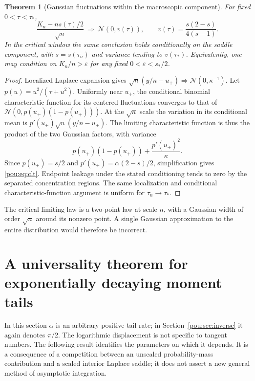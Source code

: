 \documentclass[11pt]{article}
\newtheorem{theorem}{Theorem}[section]
\theoremstyle{definition}
\theoremstyle{remark}
\newcommand{\Normal}{\mathcal N}
\newcommand{\eps}{\varepsilon}
\begin{document}
\begin{theorem}[Gaussian fluctuations within the macroscopic component]
\label{pou:thm:clt}
For fixed $0<\tau<\tau_*$,
\begin{equation}\label{pou:eq:clt}
 \frac{K_n-ns(\tau)/2}{\sqrt n}
 \ \Longrightarrow\ \Normal\left(0,
   v(\tau)\right),\qquad
 v(\tau)=\frac{s(2-s)}{4(s-1)}.
\end{equation}
In the critical window the same conclusion holds conditionally on the
saddle component, with $s=s(\tau_n)$ and variance tending to $v(\tau_*)$.
Equivalently, one may condition on $K_n/n>\eps$ for any fixed
$0<\eps<s_*/2$.
\end{theorem}
\begin{proof}
Localized Laplace expansion gives
$\sqrt n(y/n-u_+)\Longrightarrow\Normal(0,\kappa^{-1})$.
Let $p(u)=u^2/(\tau+u^2)$.  Uniformly near $u_+$, the conditional
binomial characteristic function for its centered fluctuations converges
to that of $\Normal(0,p(u_+)(1-p(u_+)))$.
At the $\sqrt n$ scale the variation in its conditional mean is
$p'(u_+)\sqrt n(y/n-u_+)$.  The limiting characteristic function is thus
the product of the two Gaussian factors, with variance
\[
 p(u_+)(1-p(u_+))+\frac{p'(u_+)^2}{\kappa}.
\]
Since $p(u_+)=s/2$ and $p'(u_+)=\alpha(2-s)/2$, simplification gives
\eqref{pou:eq:clt}.  Endpoint leakage under the stated conditioning tends to
zero by the separated concentration regions.  The same localization and
conditional characteristic-function argument is uniform for
$\tau_n\to\tau_*$.
\end{proof}

The critical limiting law is a two-point law at scale $n$, with a Gaussian
width of order $\sqrt n$ around its nonzero point.  A single Gaussian
approximation to the entire distribution would therefore be incorrect.

\section{A universality theorem for exponentially decaying moment tails}
\label{pou:sec:universal}

In this section $\alpha$ is an arbitrary positive tail rate; in
Section~\ref{pou:sec:inverse} it again denotes $\pi/2$.
The logarithmic displacement is not specific to tangent numbers.  The
following result identifies the parameters on which it depends.
It is a consequence of a competition between an unscaled probability-mass
contribution and a scaled interior Laplace saddle; it does not assert a new
general method of asymptotic integration.
\end{document}
